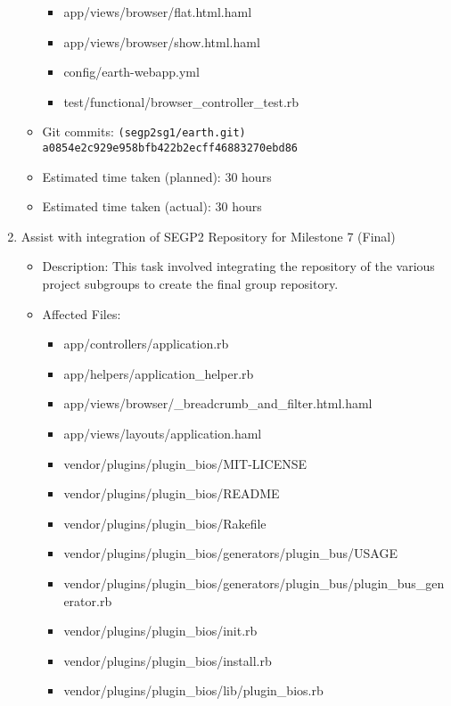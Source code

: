 \begin{enumerate}
\begin{itemize}
\begin{itemize}
                    \item app/views/browser/flat.html.haml
                    \item app/views/browser/show.html.haml
                    \item config/earth-webapp.yml
                    \item test/functional/browser\_controller\_test.rb
                \end{itemize}
            \item Git commits: \texttt{(segp2sg1/earth.git) a0854e2c929e958bfb422b2ecff46883270ebd86}
            \item Estimated time taken (planned): 30 hours
            \item Estimated time taken (actual): 30 hours
        \end{itemize}
    \item Assist with integration of SEGP2 Repository for Milestone 7 (Final)
        \begin{itemize}
            \item Description: This task involved integrating the repository of the various project subgroups to create the final group repository.
            \item Affected Files:
                \begin{itemize}
                    \item app/controllers/application.rb
                    \item app/helpers/application\_helper.rb
                    \item app/views/browser/\_breadcrumb\_and\_filter.html.haml
                    \item app/views/layouts/application.haml
                    \item vendor/plugins/plugin\_bios/MIT-LICENSE
                    \item vendor/plugins/plugin\_bios/README
                    \item vendor/plugins/plugin\_bios/Rakefile
                    \item vendor/plugins/plugin\_bios/generators/plugin\_bus/USAGE
                    \item vendor/plugins/plugin\_bios/generators/plugin\_bus/plugin\_bus\_generator.rb
                    \item vendor/plugins/plugin\_bios/init.rb
                    \item vendor/plugins/plugin\_bios/install.rb
                    \item vendor/plugins/plugin\_bios/lib/plugin\_bios.rb

\end{itemize}
\end{itemize}
\end{enumerate}
